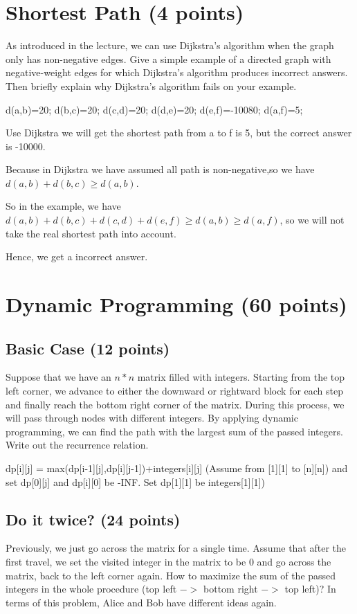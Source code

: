 \documentclass[11pt]{exam}
\begin{document}
\section{Shortest Path (4 points)}
As introduced in the lecture, we can use Dijkstra's algorithm when the graph only has non-negative edges. Give a simple example of a directed graph with negative-weight edges for which Dijkstra's algorithm produces incorrect answers. Then briefly explain why Dijkstra's algorithm fails on your example.
\begin{solution}

    d(a,b)=20;
    d(b,c)=20;
    d(c,d)=20;
    d(d,e)=20;
    d(e,f)=-10080;
    d(a,f)=5;

    Use Dijkstra we will get the shortest path from a to f is 5, but the correct answer is -10000.

    Because in Dijkstra we have assumed all path is non-negative,so we have $d(a,b)+d(b,c)\geq d(a,b)$.

    So in the example, we have $d(a,b)+d(b,c)+d(c,d)+d(e,f)\geq d(a,b) \geq d(a,f)$, so we will not take the real shortest path into account.

    Hence, we get a incorrect answer.
\end{solution}

\section{Dynamic Programming (60 points)}
\subsection{Basic Case (12 points)}
\label{simple_repeat}
Suppose that we have an $n*n$ matrix filled with integers. Starting from the top left corner, we advance to either the downward or rightward block for each step and finally reach the bottom right corner of the matrix. During this process, we will pass through nodes with different integers. By applying dynamic programming, we can find the path with the largest sum of the passed integers. Write out the recurrence relation.
\begin{solution}
    dp[i][j] = max(dp[i-1][j],dp[i][j-1])+integers[i][j]
    (Assume from [1][1] to [n][n]) and set dp[0][j] and dp[i][0] be -INF. Set dp[1][1] be integers[1][1])
\end{solution}
\subsection{Do it twice? (24 points)}
Previously, we just go across the matrix for a single time. Assume that after the first travel, we set the visited integer in the matrix to be 0 and go across the matrix, back to the left corner again. How to maximize the sum of the passed integers in the whole procedure (top left $->$ bottom right $->$ top left)? In terms of this problem, Alice and Bob have different ideas again.
\end{document}
